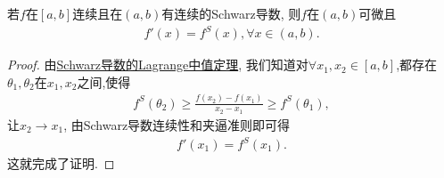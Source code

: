 \documentclass[../../main.tex]{subfiles}%
\begin{document}
\begin{proposition}
若$f$在$[a,b]$连续且在$(a,b)$有连续的Schwarz导数, 则$f$在$(a,b)$可微且
\begin{align*}
f'(x) = f^S(x), \forall x \in (a,b).
\end{align*}
\end{proposition}
\begin{proof}
由\hyperref[theorem:Schwarz导数的Lagrange中值定理]{Schwarz导数的Lagrange中值定理}, 我们知道对$\forall x_1,x_2\in [a,b]$,都存在$\theta_1,\theta_2$在$x_1,x_2$之间,使得
\begin{align*}
f^S(\theta_2) \geqslant \frac{f(x_2) - f(x_1)}{x_2 - x_1} \geqslant f^S(\theta_1),
\end{align*}
让$x_2 \to x_1$, 由Schwarz导数连续性和夹逼准则即可得
\begin{align*}
f'(x_1) = f^S(x_1).
\end{align*}
这就完成了证明.
\end{proof}
\end{document}
